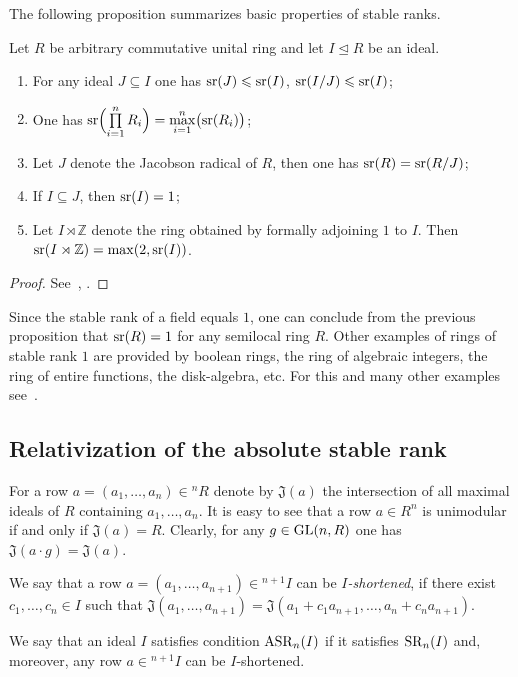 The following proposition summarizes basic properties of stable ranks.
\begin{prop} \label{prop:sr_properties}
Let $R$ be arbitrary commutative unital ring and let $I\trianglelefteq R$ be an ideal.
\begin{enumerate}
\item For any ideal $J\subseteq I$ one has $\operatorname{sr}(J)\leqslant\operatorname{sr}(I)$, $\operatorname{sr}(I/J)\leqslant\operatorname{sr}(I)$;
\item One has $\operatorname{sr}\Bigl(\prod\limits_{i=1}^n R_i\Bigr)=\max\limits_{i=1}^n\bigl(\operatorname{sr}(R_i)\bigr)$;
\item Let $J$ denote the Jacobson radical of $R$, then one has $\operatorname{sr}(R)=\operatorname{sr}(R/J)$;
\item If $I\subseteq J$, then $\operatorname{sr}(I)=1$;
\item Let $I\rtimes\mathbb{Z}$ denote the ring obtained by formally adjoining $1$ to $I$. Then $\operatorname{sr}(I\rtimes\mathbb{Z})=\max(2,\operatorname{sr}(I))$.
\end{enumerate}
\end{prop}
\begin{proof} See~\cite[Theorem~2.3]{Va69}, \cite{Va71}. 
\end{proof}
\begin{example}
Since the stable rank of a field equals $1$, one can conclude from the previous proposition that $\operatorname{sr}(R)=1$ for any semilocal ring $R$.
Other examples of rings of stable rank $1$ are provided by boolean rings, the ring of algebraic integers, the ring of entire functions, the disk-algebra, etc. For this and many other examples see~\cite{VasSR1}.

\end{example}

\subsection{Relativization of the absolute stable rank}\label{sec:rel-asr}
For a row $a=(a_1,\ldots,a_n)\in{}^n\!R$ denote by $\mathfrak{J}(a)$ the intersection of all maximal ideals of $R$ containing $a_1,\ldots,a_n$.
It is easy to see that a row $a\in R^n$ is unimodular if and only if $\mathfrak{J}(a)=R$. 
Clearly, for any $g\in\operatorname{GL}(n,R)$ one has $\mathfrak{J}(a\cdot g)=\mathfrak{J}(a)$.
\begin{dfn}\label{dfn:j-stable}
We say that a row $a=(a_1,\ldots,a_{n+1})\in{}^{n+1}\!I$ can be {\it $I$-shortened}, if there exist $c_1,\ldots,c_n\in I$ such that
$\mathfrak{J}(a_1,\ldots,a_{n+1})=\mathfrak{J}(a_1+c_1a_{n+1},\ldots,a_n+c_na_{n+1}).$
\end{dfn}
\begin{dfn}\label{dfn:asr}
We say that an ideal $I$ satisfies condition $\operatorname{ASR}_n(I)$ if it satisfies $\operatorname{SR}_n(I)$ and, moreover, any row $a\in{}^{n+1}\!I$ can be $I$-shortened.
\end{dfn}

